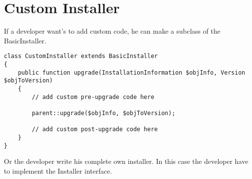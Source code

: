 \section[sec:custom installer code]{Custom Installer}

If a developer want's to add custom code, he can make a subclass of the BasicInstaller.

\begin{lstlisting}[caption=Custom Installer Code Example]
class CustomInstaller extends BasicInstaller
{
	public function upgrade(InstallationInformation $objInfo, Version $objToVersion)
	{
		// add custom pre-upgrade code here
		
		parent::upgrade($objInfo, $objToVersion);
		
		// add custom post-upgrade code here
	}	
}
\end{lstlisting}

Or the developer write his complete own installer. In this case the developer have to implement the Installer interface.
